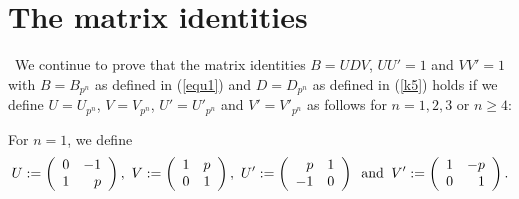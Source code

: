 \documentclass[a4paper,11pt]{amsart}
\begin{document}

\section{The matrix identities}
 \ \quad We continue to prove that the matrix identities $B=UDV$, $UU'=1$ and $VV'=1$ with $B=B_{p^n}$ as defined in (\ref{equ1}) and $D=D_{p^n}$ as defined in (\ref{k5})
 holds if we define $U=U_{p^n}$, $V=V_{p^n}$, $U'=U'_{p^n}$ and $V'=V'_{p^n}$ as follows for $n=1,2,3$ or $n\geq4$:
%  
%  
%  

\vspace*{5pt}
For $n=1$, we define 
$$
U:=\left(\begin{array}{rr}
0 & -1 \\
1 & p
\end{array}\right),\text{  }
V:=\left(\begin{array}{rr}
1 & p \\
0 & 1
\end{array}\right),\text{  }
U':=\left(\begin{array}{rr}
p & 1 \\
-1 & 0
\end{array}\right)\text{ \hspace{2pt}and\hspace{2pt} }
V':=\left(\begin{array}{rr}
1 & -p \\
0 & 1
\end{array}\right).$$
\end{document}
